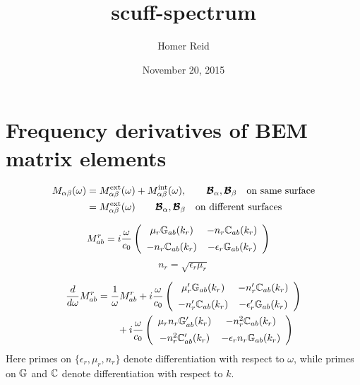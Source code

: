 \documentclass[letterpaper]{article}
\title {{\sc scuff-spectrum}}
\author {Homer Reid}
\date {November 20, 2015}
\begin{document}
\pagestyle{myheadings}
\maketitle 

\tableofcontents

\newpage
\section{Frequency derivatives of BEM matrix elements}

\begin{align*}
 M_{\alpha\beta}(\omega)
&= M_{\alpha\beta}^{\hbox{\scriptsize{ext}}}(\omega)
  +M_{\alpha\beta}^{\hbox{\scriptsize{int}}}(\omega),
   \qquad \boldsymbol{\mathcal{B}}_\alpha, \boldsymbol{\mathcal{B}}_\beta \quad \text{on same surface}
\\
&= M_{\alpha\beta}^{\hbox{\scriptsize{ext}}}(\omega)
   \qquad \boldsymbol{\mathcal{B}}_\alpha, \boldsymbol{\mathcal{B}}_\beta \quad \text{on different surfaces}
\end{align*}

\begin{align*}
 M_{ab}^r
 &=i\frac{\omega}{c_0} 
   \left(\begin{array}{cc}
       \mu_r \mathbb{G}_{ab}(k_r) & -n_r \mathbb{C}_{ab}(k_r) \\[5pt]
       -n_r \mathbb{C}_{ab}(k_r) & -\epsilon_r \mathbb{G}_{ab}(k_r)
   \end{array}\right)
\end{align*}
$$ n_r=\sqrt{\epsilon_r \mu_r}$$

\begin{align*}
\frac{d}{d\omega}
 M_{ab}^r
 &= \frac{1}{\omega} M_{ab}^r
    +i\frac{\omega}{c_0} 
     \left(\begin{array}{cc}
       \mu_r^\prime \mathbb{G}_{ab}(k_r) & -n_r^\prime \mathbb{C}_{ab}(k_r) \\[5pt]
       -n_r^\prime \mathbb{C}_{ab}(k_r) & -\epsilon_r^\prime \mathbb{G}_{ab}(k_r)
     \end{array}\right)
\\
&\qquad
    +i\frac{\omega}{c_0} 
     \left(\begin{array}{cc}
       \mu_r n_r \mathbb{G}^\prime_{ab}(k_r) & -n_r^2 \mathbb{C}_{ab}(k_r) \\[5pt]
       -n_r^2 \mathbb{C}^\prime_{ab}(k_r) & -\epsilon_r n_r \mathbb{G}_{ab}(k_r)
     \end{array}\right)
\end{align*}
Here primes on $\{\epsilon_r, \mu_r, n_r\}$ denote differentiation with 
respect to $\omega$, while primes on $\mathbb{G}$ and $\mathbb{C}$ denote 
differentiation with respect to $k$. 
\end{document}
